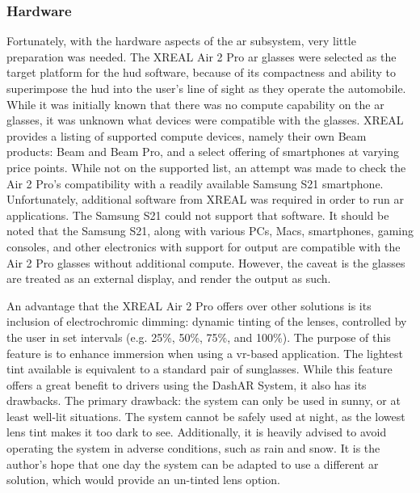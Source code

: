         \subsubsection{Hardware}
            \par Fortunately, with the hardware aspects of the \gls{ar} subsystem, very little preparation was needed. The XREAL Air 2 Pro \gls{ar} glasses were selected as the target platform for the \gls{hud} software, because of its compactness and ability to superimpose the \gls{hud} into the user's line of sight as they operate the automobile. While it was initially known that there was no compute capability on the \gls{ar} glasses, it was unknown what devices were compatible with the glasses. XREAL provides a listing of supported compute devices, namely their own Beam products: Beam and Beam Pro, and a select offering of smartphones at varying price points. While not on the supported list, an attempt was made to check the Air 2 Pro's compatibility with a readily available Samsung S21 smartphone. Unfortunately, additional software from XREAL was required in order to run \gls{ar} applications. The Samsung S21 could not support that software. It should be noted that the Samsung S21, along with various PCs, Macs, smartphones, gaming consoles, and other electronics with support for  output are compatible with the Air 2 Pro glasses without additional compute. However, the caveat is the glasses are treated as an external display, and render the output as such.

            \par An advantage that the XREAL Air 2 Pro offers over other solutions is its inclusion of electrochromic dimming: dynamic tinting of the lenses, controlled by the user in set intervals (e.g. 25\%, 50\%, 75\%, and 100\%). The purpose of this feature is to enhance immersion when using a \gls{vr}-based application. The lightest tint available is equivalent to a standard pair of sunglasses. While this feature offers a great benefit to drivers using the DashAR System, it also has its drawbacks. The primary drawback: the system can only be used in sunny, or at least well-lit situations. The system cannot be safely used at night, as the lowest lens tint makes it too dark to see. Additionally, it is heavily advised to avoid operating the system in adverse conditions, such as rain and snow. It is the author's hope that one day the system can be adapted to use a different \gls{ar} solution, which would provide an un-tinted lens option.

